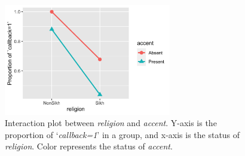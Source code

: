 \documentclass[11pt]{article}
\begin{document}
\begin{figure}[!h]
    \centering
    \includegraphics[width=0.65\textwidth]{../../Plots/Interaction_accent_religion.png}
    \caption{Interaction plot between \textit{religion} and \textit{accent}. Y-axis is the proportion of `\textit{callback=1}' in a group, and x-axis is the status of \textit{religion}. Color represents the status of \textit{accent}.}
    \label{fig:interact}
\end{figure}
\end{document}
